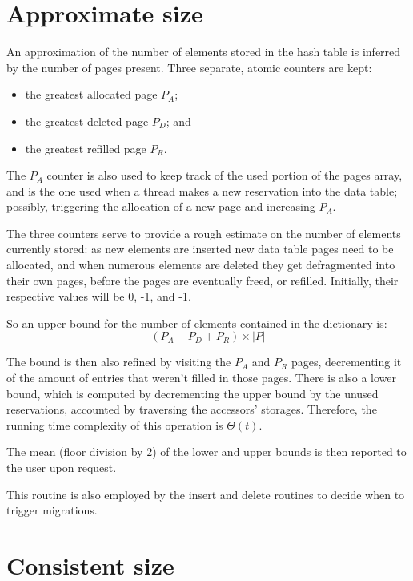 \section{Approximate size}\label{sec:approximate-size}

An approximation of the number of elements stored in the hash table is inferred by the number of pages present.
Three separate, atomic counters are kept:

\begin{itemize}
    \item the greatest allocated page $P_A$;
    \item the greatest deleted page $P_D$; and
    \item the greatest refilled page $P_R$.
\end{itemize}

The $P_A$ counter is also used to keep track of the used portion of the pages array, and is the one used when a thread makes a new reservation into the data table; possibly, triggering the allocation of a new page and increasing $P_A$.

The three counters serve to provide a rough estimate on the number of elements currently stored: as new elements are inserted new data table pages need to be allocated, and when numerous elements are deleted they get defragmented into their own pages, before the pages are eventually freed, or refilled.
Initially, their respective values will be 0, -1, and -1.

So an upper bound for the number of elements contained in the dictionary is:
\[
    (P_A - P_D + P_R) \times |P|
\]

The bound is then also refined by visiting the $P_A$ and $P_R$ pages, decrementing it of the amount of entries that weren't filled in those pages.
There is also a lower bound, which is computed by decrementing the upper bound by the unused reservations, accounted by traversing the accessors' storages.
Therefore, the running time complexity of this operation is $\Theta(t)$.

The mean (floor division by 2) of the lower and upper bounds is then reported to the user upon request.

This routine is also employed by the insert and delete routines to decide when to trigger migrations.


\section{Consistent size}\label{sec:consistent-size}

